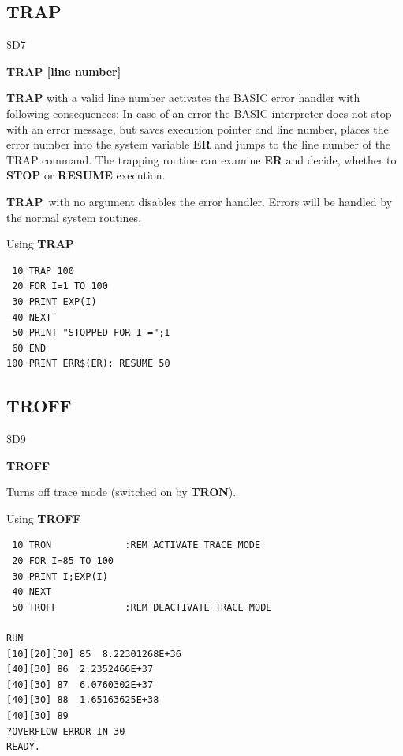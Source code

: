 \subsection{TRAP}
\begin{description}[leftmargin=2cm,style=nextline]
\item [Token:] \$D7
\item [Format:] {\bf TRAP [line number]}
\item [Usage:]  {\bf TRAP} with a valid line number activates the
                BASIC error handler with following consequences:
                In case of an error the BASIC interpreter does not
                stop with an error message, but saves execution
                pointer and line number, places the error number into the
                system variable {\bf ER} and jumps to the line number
                of the TRAP command. The trapping routine can examine
                {\bf ER} and decide, whether to {\bf STOP}
                 or {\bf RESUME} execution.

                {\bf TRAP} with no argument disables the error handler.
                Errors will be handled by the normal system routines.

\item [Example:] Using {\bf TRAP}
\begin{tcolorbox}[colback=black,coltext=white]
\verbatimfont{\codefont}
\begin{verbatim}
 10 TRAP 100
 20 FOR I=1 TO 100
 30 PRINT EXP(I)
 40 NEXT
 50 PRINT "STOPPED FOR I =";I
 60 END
100 PRINT ERR$(ER): RESUME 50
\end{verbatim}
\end{tcolorbox}
\end{description}


\newpage
\subsection{TROFF}
\begin{description}[leftmargin=2cm,style=nextline]
\item [Token:] \$D9
\item [Format:] {\bf TROFF}
\item [Usage:]  Turns off trace mode (switched on by {\bf TRON}).

\item [Example:] Using {\bf TROFF}
\begin{tcolorbox}[colback=black,coltext=white]
\verbatimfont{\codefont}
\begin{verbatim}
 10 TRON             :REM ACTIVATE TRACE MODE
 20 FOR I=85 TO 100
 30 PRINT I;EXP(I)
 40 NEXT
 50 TROFF            :REM DEACTIVATE TRACE MODE

RUN
[10][20][30] 85  8.22301268E+36
[40][30] 86  2.2352466E+37
[40][30] 87  6.0760302E+37
[40][30] 88  1.65163625E+38
[40][30] 89
?OVERFLOW ERROR IN 30
READY.
\end{verbatim}
\end{tcolorbox}
\end{description}

